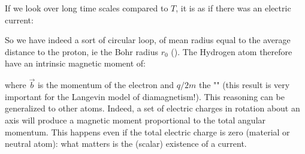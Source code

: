 	If we look over long time scales compared to $T$, it is as if there was an electric current:
	
	So we have indeed a sort of circular loop, of mean radius equal to the average distance to the proton, ie the Bohr radius $r_0$ (). The Hydrogen atom therefore have an intrinsic magnetic moment of:
	
	where $\vec{b}$ is the momentum of the electron and $q / 2m$ the "" (this result is very important for the Langevin model of diamagnetism!). This reasoning can be generalized to other atoms. Indeed, a set of electric charges in rotation about an axis will produce a magnetic moment proportional to the total angular momentum. This happens even if the total electric charge is zero (material or neutral atom): what matters is the (scalar) existence of a current.
	
